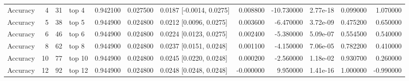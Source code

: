 \begin{table}
\begin{tabular}{lrrlrrlrrlrr}
Accuracy & 4 & 31 & top 4 & 0.942100 & 0.027500 & 0.0187 [-0.0014, 0.0275] & 0.008800 & -10.730000 & 2.77e-18 & 0.099000 & 1.070000 \\
Accuracy & 5 & 38 & top 5 & 0.944900 & 0.024800 & 0.0212 [0.0096, 0.0275] & 0.003600 & -6.470000 & 3.72e-09 & 0.475200 & 0.650000 \\
Accuracy & 6 & 46 & top 6 & 0.944900 & 0.024800 & 0.0224 [0.0123, 0.0275] & 0.002400 & -5.380000 & 5.09e-07 & 0.554500 & 0.540000 \\
Accuracy & 8 & 62 & top 8 & 0.944900 & 0.024800 & 0.0237 [0.0151, 0.0248] & 0.001100 & -4.150000 & 7.06e-05 & 0.782200 & 0.410000 \\
Accuracy & 10 & 77 & top 10 & 0.944900 & 0.024800 & 0.0245 [0.0220, 0.0248] & 0.000200 & -2.560000 & 1.18e-02 & 0.930700 & 0.260000 \\
Accuracy & 12 & 92 & top 12 & 0.944900 & 0.024800 & 0.0248 [0.0248, 0.0248] & -0.000000 & 9.950000 & 1.41e-16 & 1.000000 & -0.990000 \\
\bottomrule
\end{tabular}
\end{table}
